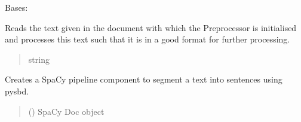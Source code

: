 \documentclass[letterpaper,10pt,english]{sphinxmanual}
\begin{document}
\begin{fulllineitems}
\label{\detokenize{medextractor.preprocessor:medextractor.preprocessor.preprocessor.RuleBasedPreprocessor}}
\pysigstartsignatures
{}
\pysigstopsignatures
\sphinxAtStartPar
Bases: 

\begin{fulllineitems}
\label{\detokenize{medextractor.preprocessor:medextractor.preprocessor.preprocessor.RuleBasedPreprocessor.get_preprocessed_text}}
\pysigstartsignatures
{}
\pysigstopsignatures
\sphinxAtStartPar
Reads the text given in the document with which the Preprocessor is initialised and
processes this text such that it is in a good format for further processing.
\begin{quote}\begin{description}
\sphinxAtStartPar
{} \textendash{} 

\sphinxAtStartPar
string

\end{description}\end{quote}

\end{fulllineitems}


\begin{fulllineitems}
\label{\detokenize{medextractor.preprocessor:medextractor.preprocessor.preprocessor.RuleBasedPreprocessor.pysbd_sentence_boundaries}}
\pysigstartsignatures
{}
\pysigstopsignatures
\sphinxAtStartPar
Creates a SpaCy pipeline component to segment a text into sentences using pysbd.
\begin{quote}\begin{description}
\sphinxAtStartPar
{} () \textendash{} SpaCy Doc object


\end{description}
\end{quote}
\end{fulllineitems}
\end{fulllineitems}
\end{document}
